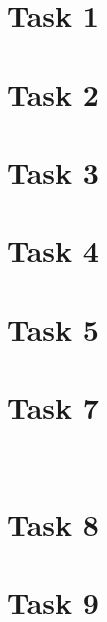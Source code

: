 \documentclass{article}
\begin{document}
\section{Task 1}

\newpage

\newpage
\section{Task 2}

\newpage

\newpage
\section{Task 3}

\newpage
\section{Task 4}

\newpage

\newpage
\section{Task 5}

\newpage

\newpage
\section{Task 7}

\
\section{Task 8}

\newpage

\newpage
\section{Task 9}

\newpage

\newpage

\newpage

\newpage
\end{document}
